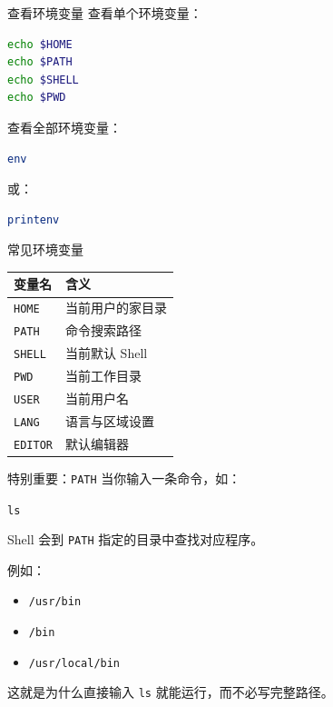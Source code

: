 \documentclass[aspectratio=169]{beamer}
\begin{document}
\begin{frame}[fragile]{查看环境变量}
查看单个环境变量：

\begin{lstlisting}[language=bash]
echo $HOME
echo $PATH
echo $SHELL
echo $PWD
\end{lstlisting}

查看全部环境变量：

\begin{lstlisting}[language=bash]
env
\end{lstlisting}

或：

\begin{lstlisting}[language=bash]
printenv
\end{lstlisting}
\end{frame}

\begin{frame}{常见环境变量}
\begin{center}
\begin{tabular}{ll}
\toprule
变量名 & 含义 \\
\midrule
\texttt{HOME} & 当前用户的家目录 \\
\texttt{PATH} & 命令搜索路径 \\
\texttt{SHELL} & 当前默认 Shell \\
\texttt{PWD} & 当前工作目录 \\
\texttt{USER} & 当前用户名 \\
\texttt{LANG} & 语言与区域设置 \\
\texttt{EDITOR} & 默认编辑器 \\
\bottomrule
\end{tabular}
\end{center}
\end{frame}

\begin{frame}{特别重要：\texttt{PATH}}
当你输入一条命令，如：

\begin{center}
\texttt{ls}
\end{center}

Shell 会到 \texttt{PATH} 指定的目录中查找对应程序。

\vspace{0.8em}
例如：
\begin{itemize}
  \item \texttt{/usr/bin}
  \item \texttt{/bin}
  \item \texttt{/usr/local/bin}
\end{itemize}

\vspace{0.8em}
这就是为什么直接输入 \texttt{ls} 就能运行，而不必写完整路径。
\end{frame}
\end{document}

